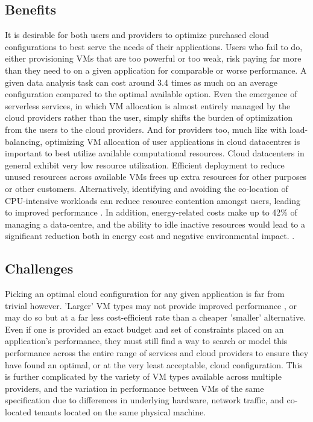 \documentclass{report}
\begin{document}
\subsection{Benefits}
It is desirable for both users and providers to optimize purchased cloud configurations to best serve the needs of their applications. Users who fail to do, either provisioning VMs that are too powerful or too weak, risk paying far more than they need to on a given application for comparable or worse performance. A given data analysis task can cost around 3.4 times as much on an average configuration compared to the optimal available option\cite{Alipourfard2017}. Even the emergence of serverless services, in which VM allocation is almost entirely managed by the cloud providers rather than the user, simply shifts the burden of optimization from the users to the cloud providers. And for providers too, much like with load-balancing, optimizing VM allocation of user applications in cloud datacentres is important to best utilize available computational resources. Cloud datacenters in general exhibit very low resource utilization\cite{Reiss2012}. Efficient deployment to reduce unused resources across available VMs frees up extra resources for other purposes or other customers. Alternatively, identifying and avoiding the co-location of CPU-intensive workloads can reduce resource contention amongst users, leading to improved performance \cite{Pu2010}.  In addition, energy-related costs make up to 42\% of managing a data-centre, and the ability to idle inactive resources would lead to a significant reduction both in energy cost and negative environmental impact. \cite{Berl2010, Gkatzikis2013}. 

\subsection{Challenges}
Picking an optimal cloud configuration for any given application is far from trivial however. 'Larger' VM types may not provide improved performance \cite{Yadwadkar2017}, or may do so but at a far less cost-efficient rate than a cheaper 'smaller' alternative. Even if one is provided an exact budget and set of constraints placed on an application's performance, they must still find a way to search or model this performance across the entire range of services and cloud providers to ensure they have found an optimal, or at the very least acceptable, cloud configuration. This is further complicated by the variety of VM types available across multiple providers, and the variation in performance between VMs of the same specification due to differences in underlying hardware, network traffic, and co-located tenants located on the same physical machine.
\end{document}
